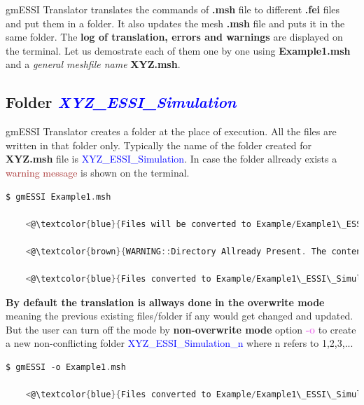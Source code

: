 \documentclass[11pt]{article}
\begin{document}
gmESSI Translator translates the commands of \textbf{.msh} file to different
\textbf{.fei} files and put them in a folder. It also updates the mesh
\textbf{.msh} file and puts it in the same folder. The \textbf{log of
translation, errors and warnings} are displayed on the terminal. Let us
demostrate each of them one by one using \textbf{Example1.msh}  and a
\textit{general meshfile name} \textbf{XYZ.msh}.

  \subsection{Folder \textcolor{blue}{\textit{XYZ\_ESSI\_Simulation}}}


    gmESSI Translator creates a folder at the place of execution. All the
    files are written in that folder only. Typically the name of the folder
    created for \textbf{XYZ.msh} file is
    \textcolor{blue}{XYZ\_ESSI\_Simulation}. In case the folder allready
    exists a \textcolor{brown}{warning message} is shown on the terminal.

    \begin{lstlisting}[language=C,backgroundcolor=\color{grayish}]
    $ gmESSI Example1.msh 

    <@\textcolor{blue}{Files will be converted to Example/Example1\_ESSI\_Simulation}@>  

    <@\textcolor{brown}{WARNING::Directory Allready Present. The contents of the Folder may get changed}@> 

    <@\textcolor{blue}{Files converted to Example/Example1\_ESSI\_Simulation}@>  
    \end{lstlisting}

    \textbf{By default the translation is allways done in the overwrite mode}
    meaning the previous existing files/folder if any would get changed and
    updated. But the user can turn off the mode by \textbf{non-overwrite
    mode} option \textcolor{violet}{\textbf{-o}} to create a new non-conflicting 
    folder \textcolor{blue}{XYZ\_ESSI\_Simulation\_n} where n
    refers to 1,2,3,...

    \begin{lstlisting}[language=C,backgroundcolor=\color{grayish}]
    $ gmESSI -o Example1.msh 

    <@\textcolor{blue}{Files converted to Example/Example1\_ESSI\_Simulation\_1}@>  
    \end{lstlisting}
\end{document}
